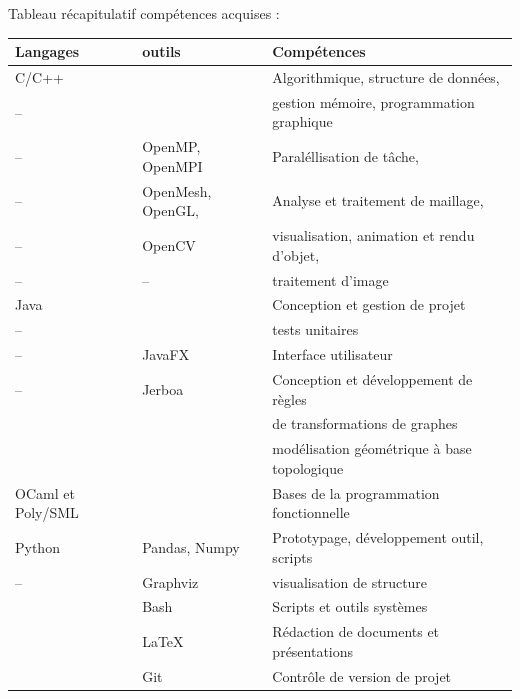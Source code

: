 \documentclass[11pt,a4paper,oneside]{article}
\begin{document}
Tableau récapitulatif compétences acquises :
\begin{center}
	\begin{tabular}{|l|l|l|}
		\hline
		Langages          & outils            & Compétences                                 \\
		\hline
		C/C++             &                   & Algorithmique, structure de données,        \\
		–                 &                   & gestion mémoire, programmation graphique    \\
		–                 & OpenMP, OpenMPI   & Paraléllisation de tâche,                   \\
		–                 & OpenMesh, OpenGL, & Analyse et traitement de maillage,          \\
		–                 & OpenCV            & visualisation, animation et rendu d'objet,  \\
		–                 & –                 & traitement d'image                          \\
		\hline
		Java              &                   & Conception et gestion de projet             \\
		–                 &                   & tests unitaires                             \\

		–                 & JavaFX            & Interface utilisateur                       \\
		–                 & Jerboa            & Conception et développement de règles       \\
		                  &                   & de transformations de graphes               \\
		                  &                   & modélisation géométrique à base topologique \\
		\hline
		OCaml et Poly/SML &                   & Bases de la programmation fonctionnelle     \\
		\hline
		Python            & Pandas, Numpy     & Prototypage, développement outil, scripts   \\
		–                 & Graphviz          & visualisation de structure                  \\
		\hline
		                  & Bash              & Scripts et outils systèmes                  \\
		\hline
		                  & LaTeX             & Rédaction de documents et présentations     \\
		\hline
		                  & Git               & Contrôle de version de projet               \\
		\hline
	\end{tabular}
\end{center}
\end{document}
